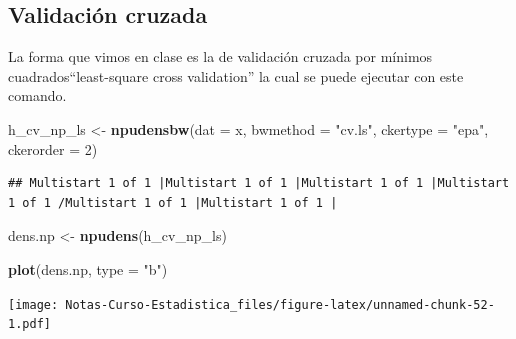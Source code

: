 \documentclass[
  12pt,
]{book}
\newenvironment{Shaded}{\begin{snugshade}}{\end{snugshade}}
\newcommand{\DataTypeTok}[1]{\textcolor[rgb]{0.13,0.29,0.53}{#1}}
\newcommand{\DecValTok}[1]{\textcolor[rgb]{0.00,0.00,0.81}{#1}}
\newcommand{\KeywordTok}[1]{\textcolor[rgb]{0.13,0.29,0.53}{\textbf{#1}}}
\newcommand{\NormalTok}[1]{#1}
\newcommand{\StringTok}[1]{\textcolor[rgb]{0.31,0.60,0.02}{#1}}
\theoremstyle{definition}
\theoremstyle{definition}
\theoremstyle{definition}
\theoremstyle{remark}
\begin{document}
\hypertarget{validaciuxf3n-cruzada-1}{%
\subsection{Validación cruzada}\label{validaciuxf3n-cruzada-1}}

La forma que vimos en clase es la de validación cruzada por mínimos
cuadrados``least-square cross validation'' la cual se puede ejecutar
con este comando.

\begin{Shaded}
\begin{Highlighting}[]
\NormalTok{h_cv_np_ls <-}\StringTok{ }\KeywordTok{npudensbw}\NormalTok{(}\DataTypeTok{dat =}\NormalTok{ x, }\DataTypeTok{bwmethod =} \StringTok{"cv.ls"}\NormalTok{, }
    \DataTypeTok{ckertype =} \StringTok{"epa"}\NormalTok{, }\DataTypeTok{ckerorder =} \DecValTok{2}\NormalTok{)}
\end{Highlighting}
\end{Shaded}

\begin{verbatim}
## Multistart 1 of 1 |Multistart 1 of 1 |Multistart 1 of 1 |Multistart 1 of 1 /Multistart 1 of 1 |Multistart 1 of 1 |                   
\end{verbatim}

\begin{Shaded}
\begin{Highlighting}[]
\NormalTok{dens.np <-}\StringTok{ }\KeywordTok{npudens}\NormalTok{(h_cv_np_ls)}

\KeywordTok{plot}\NormalTok{(dens.np, }\DataTypeTok{type =} \StringTok{"b"}\NormalTok{)}
\end{Highlighting}
\end{Shaded}

\texttt{[image: Notas-Curso-Estadistica\_files/figure-latex/unnamed-chunk-52-1.pdf]}
\end{document}

